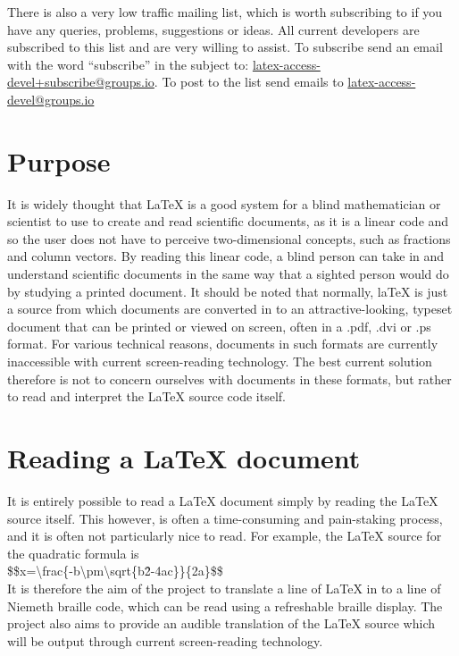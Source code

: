 \documentclass[12pt,a4paper]{report}
\begin{document}
There is also a very low traffic mailing list, which is worth subscribing to if you have any
queries, problems, suggestions or ideas. All current developers are
subscribed to this list and are very willing to assist. To subscribe
send an email with the word ``subscribe'' in the subject to:
\href{mailto:latex-access-devel+subscribe@groups.io}{latex-access-devel+subscribe@groups.io}. To
post to the list send emails to \href{mailto:latex-access-devel@groups.io}{latex-access-devel@groups.io}

\section{Purpose}
\label{subchap-purpose}
It is widely thought that LaTeX is a good system for a blind
mathematician or scientist to use to create and read
scientific documents, as it is a linear code and so the user does
not have to perceive two-dimensional concepts, such
as fractions and column vectors.
By reading this linear code, a blind person can take in and
understand scientific documents in the same way that a
sighted person would do by studying a printed document.
It should be noted that normally, laTeX is just a source from which
documents are converted in to an
attractive-looking, typeset document that can be printed or viewed
on screen, often in a .pdf, .dvi or .ps format. For
various technical reasons, documents in such formats are
currently inaccessible with current screen-reading technology.
The best current solution therefore is not to concern
ourselves with documents in these formats, but rather to
read
and interpret the LaTeX source code itself.

\section{Reading a LaTeX document}
\label{subchap-reading-latex-document}

It is entirely possible to read a LaTeX document simply by reading
the LaTeX source itself. This however, is often a
time-consuming and pain-staking process, and it is often not
particularly nice to read. For example, the LaTeX source
for the quadratic formula is\\
\mbox{\$\$x=\textbackslash frac\{-b\textbackslash pm\textbackslash sqrt\{b\^2-4ac\}\}\{2a\}\$\$}\\
It is therefore the aim of the project to translate a
line of LaTeX in to a line of Niemeth braille code, which
can be
read using a refreshable braille display. The project
also aims to provide an audible translation of the
LaTeX source
which will be output through current screen-reading
technology.          
\end{document}
